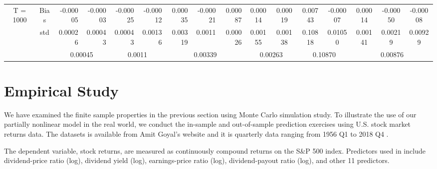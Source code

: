 \documentclass[a4paper,12pt,times,numbered,print,index]{report}
\numberwithin{equation}{section}
\begin{document}
\begin{table}[htbp]
\begin{adjustbox}{max width=\textwidth}
\begin{tabular}{cccccccccccccccc}
		\multirow{3}[1]{*}{T = 1000} & Bias  & \multicolumn{1}{r}{\textcolor[rgb]{ 0,  .439,  .753}{-0.00005}} & \multicolumn{1}{r}{-0.00003} & \multicolumn{1}{r}{-0.00025} & \multicolumn{1}{r}{-0.00012} & \multicolumn{1}{r}{0.00035} & \multicolumn{1}{r}{-0.00021} & \multicolumn{1}{r}{0.00087} & \textcolor[rgb]{ 0,  .439,  .753}{0.00014} & 0.00019 & 0.00743 & -0.00007 & 0.00014 & -0.00050 & -0.00008 \\
		& std   & \multicolumn{1}{r}{0.00026} & \multicolumn{1}{r}{0.00043} & \multicolumn{1}{r}{0.00043} & \multicolumn{1}{r}{0.00136} & \multicolumn{1}{r}{0.00319} & \multicolumn{1}{r}{0.0011} & \multicolumn{1}{r}{0.00026} & 0.00155 & 0.00138 & 0.10818 & 0.01050 & 0.00141 & 0.00219 & 0.00929 \\
		&       & \multicolumn{2}{c}{0.00045} & \multicolumn{2}{c}{0.0011} & \multicolumn{3}{c}{0.00339} & \multicolumn{2}{c}{0.00263} & \multicolumn{2}{c}{0.10870} & \multicolumn{3}{c}{0.00876} \\
		\bottomrule
		\bottomrule
    \end{tabular}%
	\end{adjustbox}
	\label{s_f7}%
\end{table}%



\section{Empirical Study}
We have examined the finite sample properties in the previous section using Monte Carlo simulation study. To illustrate the use of our partially nonlinear model in the real world, we conduct the in-sample and out-of-sample prediction exercises using U.S. stock market returns data.
The datasets is available from Amit Goyal's website and it is quarterly data ranging from 1956 Q1 to 2018 Q4 . 

The dependent variable, stock returns, are measured as continuously compound returns on the S\&P 500 index. 
Predictors used in \cite{welch2008comprehensive} include dividend-price ratio (log), dividend yield (log), earnings-price ratio (log), dividend-payout ratio (log), and other 11 predictors. 
\end{document}
